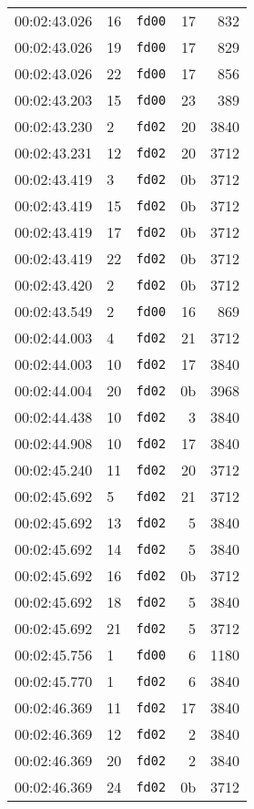 \documentclass{article}
\begin{document}
\begin{longtable}{lllrr}
00:02:43.026 & 16 & \texttt{fd00} & 17 & 832 \\
00:02:43.026 & 19 & \texttt{fd00} & 17 & 829 \\
00:02:43.026 & 22 & \texttt{fd00} & 17 & 856 \\
00:02:43.203 & 15 & \texttt{fd00} & 23 & 389 \\
00:02:43.230 & 2 & \texttt{fd02} & 20 & 3840 \\
00:02:43.231 & 12 & \texttt{fd02} & 20 & 3712 \\
00:02:43.419 & 3 & \texttt{fd02} & 0b & 3712 \\
00:02:43.419 & 15 & \texttt{fd02} & 0b & 3712 \\
00:02:43.419 & 17 & \texttt{fd02} & 0b & 3712 \\
00:02:43.419 & 22 & \texttt{fd02} & 0b & 3712 \\
00:02:43.420 & 2 & \texttt{fd02} & 0b & 3712 \\
00:02:43.549 & 2 & \texttt{fd00} & 16 & 869 \\
00:02:44.003 & 4 & \texttt{fd02} & 21 & 3712 \\
00:02:44.003 & 10 & \texttt{fd02} & 17 & 3840 \\
00:02:44.004 & 20 & \texttt{fd02} & 0b & 3968 \\
00:02:44.438 & 10 & \texttt{fd02} & 3 & 3840 \\
00:02:44.908 & 10 & \texttt{fd02} & 17 & 3840 \\
00:02:45.240 & 11 & \texttt{fd02} & 20 & 3712 \\
00:02:45.692 & 5 & \texttt{fd02} & 21 & 3712 \\
00:02:45.692 & 13 & \texttt{fd02} & 5 & 3840 \\
00:02:45.692 & 14 & \texttt{fd02} & 5 & 3840 \\
00:02:45.692 & 16 & \texttt{fd02} & 0b & 3712 \\
00:02:45.692 & 18 & \texttt{fd02} & 5 & 3840 \\
00:02:45.692 & 21 & \texttt{fd02} & 5 & 3712 \\
00:02:45.756 & 1 & \texttt{fd00} & 6 & 1180 \\
00:02:45.770 & 1 & \texttt{fd02} & 6 & 3840 \\
00:02:46.369 & 11 & \texttt{fd02} & 17 & 3840 \\
00:02:46.369 & 12 & \texttt{fd02} & 2 & 3840 \\
00:02:46.369 & 20 & \texttt{fd02} & 2 & 3840 \\
00:02:46.369 & 24 & \texttt{fd02} & 0b & 3712 \\

\end{longtable}
\end{document}

